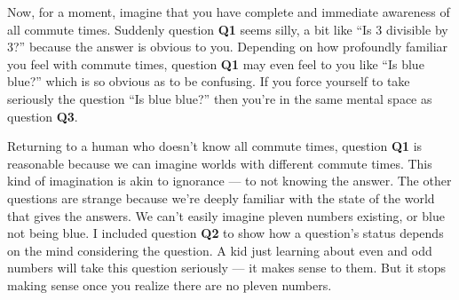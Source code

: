 \documentclass[11pt, oneside]{article}   	%
\begin{document}
Now, for a moment, imagine that you have complete and immediate awareness of all
commute times. Suddenly question {\bf Q1} seems silly, a bit like ``Is 3
divisible by 3?'' because the answer is obvious to you.
Depending on how profoundly
familiar you feel with commute times, question {\bf Q1} may even feel to you
like ``Is blue blue?'' which is so obvious as to be confusing. If you force
yourself to take seriously the question ``Is blue blue?'' then you're in the
same mental space as question {\bf Q3}.

Returning to a human who doesn't know all commute times,
question {\bf Q1} is
reasonable because we can imagine worlds with different commute
times. This kind of imagination is akin to ignorance --- to not knowing the
answer.
The other questions are strange because we're deeply familiar with the state of
the world that gives the answers. We can't easily imagine pleven numbers
existing, or blue not being blue.
I included question {\bf Q2} to show how a question's status depends on the mind
considering the question. A kid just learning about even and odd numbers will
take this question seriously --- it makes sense to them. But it stops making
sense once you realize there are no pleven numbers.

\end{document}

